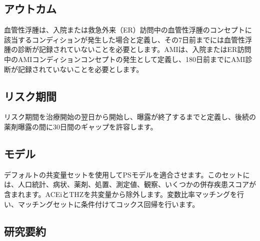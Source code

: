 \documentclass[
  11pt]{book}
\theoremstyle{definition}
\theoremstyle{definition}
\theoremstyle{definition}
\theoremstyle{definition}
\theoremstyle{remark}
\begin{document}
\subsection{アウトカム}\label{ux30a2ux30a6ux30c8ux30abux30e0-1}

血管性浮腫は、入院または救急外来（ER）訪問中の血管性浮腫のコンセプトに該当するコンディションが発生した場合と定義し、その7日前までには血管性浮腫の診断が記録されていないことを必要とします。AMIは、入院またはER訪問中のAMIコンディションコンセプトの発生として定義し、180日前までにAMI診断が記録されていないことを必要とします。

\subsection{リスク期間}\label{ux30eaux30b9ux30afux671fux9593-1}

リスク期間を治療開始の翌日から開始し、曝露が終了するまでと定義し、後続の薬剤曝露の間に30日間のギャップを許容します。

\subsection{モデル}\label{ux30e2ux30c7ux30eb}

デフォルトの共変量セットを使用してPSモデルを適合させます。このセットには、人口統計、病状、薬剤、処置、測定値、観察、いくつかの併存疾患スコアが含まれます。ACEiとTHZを共変量から除外します。変数比率マッチングを行い、マッチングセットに条件付けてコックス回帰を行います。

\subsection{研究要約}\label{ux7814ux7a76ux8981ux7d04}
\end{document}
